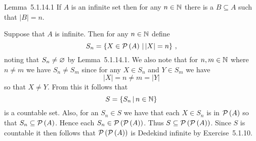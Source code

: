 
\begin{solution}
    \begin{statement}{Lemma~5.1.14.1}
        If $A$ is an infinite set then for any $n \in \mathbb{N}$ there is a $B \subseteq A$ such that $|B| = n$.
    \end{statement}


    \mainprob
    
    Suppose that $A$ is infinite.
    Then for any $n \in \mathbb{N}$ define
    $$
    S_n = \left\{ X \in \mathcal{P}\left(A\right) \,|\, |X| = n \right\} \,,
    $$
    noting that $S_n \neq \varnothing$ by Lemma~5.1.14.1.
    We also note that for $n,m \in \mathbb{N}$ where $n \neq m$ we have $S_n \neq S_m$ since for any $X \in S_n$ and $Y \in S_m$ we have
    $$
    |X| = n \neq m = |Y|
    $$
    so that $X \neq Y$.
    From this it follows that
    $$
    S = \left\{ S_n \,|\, n \in \mathbb{N} \right\}
    $$
    is a countable set.
    Also, for an $S_n \in S$ we have that each $X \in S_n$ is in $\mathcal{P}\left(A\right)$ so that $S_n \subseteq \mathcal{P}\left(A\right)$.
    Hence each $S_n \in \mathcal{P}\left(\mathcal{P}\left(A\right)\right)$.
    Thus $S \subseteq \mathcal{P}\left(\mathcal{P}\left(A\right)\right)$.
    Since $S$ is countable it then follows that $\mathcal{P}\left(\mathcal{P}\left(A\right)\right)$ is Dedekind infinite by Exercise~5.1.10.
\end{solution}


